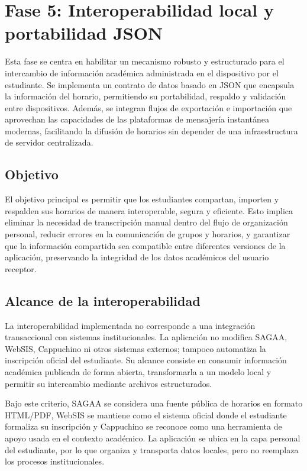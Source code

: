 \section{Fase 5: Interoperabilidad local y portabilidad JSON}

Esta fase se centra en habilitar un mecanismo robusto y estructurado para el intercambio de información académica administrada en el dispositivo por el estudiante. Se implementa un contrato de datos basado en JSON que encapsula la información del horario, permitiendo su portabilidad, respaldo y validación entre dispositivos. Además, se integran flujos de exportación e importación que aprovechan las capacidades de las plataformas de mensajería instantánea modernas, facilitando la difusión de horarios sin depender de una infraestructura de servidor centralizada.

\subsection{Objetivo}
El objetivo principal es permitir que los estudiantes compartan, importen y respalden sus horarios de manera interoperable, segura y eficiente. Esto implica eliminar la necesidad de transcripción manual dentro del flujo de organización personal, reducir errores en la comunicación de grupos y horarios, y garantizar que la información compartida sea compatible entre diferentes versiones de la aplicación, preservando la integridad de los datos académicos del usuario receptor.

\subsection{Alcance de la interoperabilidad}
La interoperabilidad implementada no corresponde a una integración transaccional con sistemas institucionales. La aplicación no modifica SAGAA, WebSIS, Cappuchino ni otros sistemas externos; tampoco automatiza la inscripción oficial del estudiante. Su alcance consiste en consumir información académica publicada de forma abierta, transformarla a un modelo local y permitir su intercambio mediante archivos estructurados.

Bajo este criterio, SAGAA se considera una fuente pública de horarios en formato HTML/PDF, WebSIS se mantiene como el sistema oficial donde el estudiante formaliza su inscripción y Cappuchino se reconoce como una herramienta de apoyo usada en el contexto académico. La aplicación se ubica en la capa personal del estudiante, por lo que organiza y transporta datos locales, pero no reemplaza los procesos institucionales.

